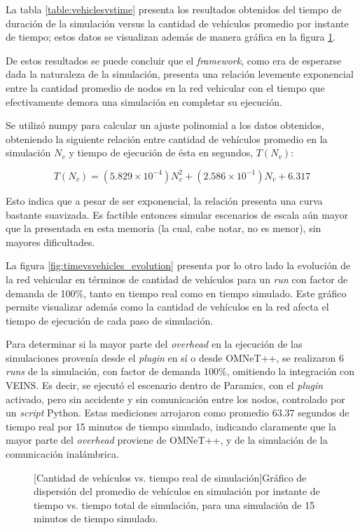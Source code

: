La tabla \ref{table:vehiclesvstime} presenta los resultados obtenidos del tiempo de duración de la simulación versus la cantidad de vehículos promedio por instante de tiempo; estos datos se visualizan además de manera gráfica en la figura \ref{fig:vehiclesvstime}.

De estos resultados se puede concluir que el \emph{framework}, como era de esperarse dada la naturaleza de la simulación, presenta una relación levemente exponencial entre la cantidad promedio de nodos en la red vehicular con el tiempo que efectivamente demora una simulación en completar su ejecución.

Se utilizó numpy para calcular un ajuste polinomial a los datos obtenidos, obteniendo la siguiente relación entre cantidad de vehículos promedio en la simulación $N_{v}$ y tiempo de ejecución de ésta en segundos, $T(N_{v})$:

\[ T(N_{v}) = (5.829 \times 10^{-4})N_{v}^{2} + (2.586 \times 10^{-1})N_{v} + 6.317 \]

Esto indica que a pesar de ser exponencial, la relación presenta una curva bastante suavizada. Es factible entonces simular escenarios de escala aún mayor que la presentada en esta memoria (la cual, cabe notar, no es menor), sin mayores dificultades.

La figura \ref{fig:timevsvehicles_evolution} presenta por lo otro lado la evolución de la red vehicular en términos de cantidad de vehículos para un \emph{run} con factor de demanda de 100\%, tanto en tiempo real como en tiempo simulado. Este gráfico permite visualizar además como la cantidad de vehículos en la red afecta el tiempo de ejecución de cada paso de simulación.

Para determinar si la mayor parte del \emph{overhead} en la ejecución de las simulaciones provenía desde el \emph{plugin} en sí o desde OMNeT++, se realizaron 6 \emph{runs} de la simulación, con factor de demanda 100\%, omitiendo la integración con VEINS. Es decir, se ejecutó el escenario dentro de Paramics, con el \emph{plugin} activado, pero sin accidente y sin comunicación entre los nodos, controlado por un \emph{script} Python. Estas mediciones arrojaron como promedio 63.37 segundos de tiempo real por 15 minutos de tiempo simulado, indicando claramente que la mayor parte del \emph{overhead} proviene de OMNeT++, y de la simulación de la comunicación inalámbrica.

\begin{figure}[tpb]
    \centering    
    
    [Cantidad de vehículos vs. tiempo real de simulación]{Gráfico de dispersión del promedio de vehículos en simulación por instante de tiempo vs. tiempo total de simulación, para una simulación de 15 minutos de tiempo simulado.}
    \label{fig:vehiclesvstime}
\end{figure}

